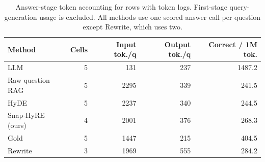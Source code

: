 \begin{table}[H]
\centering
\caption{Answer-stage token accounting for rows with token logs. First-stage query-generation usage is excluded. All methods use one scored answer call per question except Rewrite, which uses two.}
\label{tab:usage_metrics}
\footnotesize
\begin{tabular}{lrrrr}
\toprule
Method & Cells & Input tok./q & Output tok./q & Correct / 1M tok. \\
\midrule
LLM & 5 & 131 & 237 & 1487.2 \\
Raw question RAG & 5 & 2295 & 339 & 241.5 \\
HyDE & 5 & 2237 & 340 & 244.5 \\
Snap-HyRE (ours) & 4 & 2001 & 376 & 268.3 \\
Gold & 5 & 1447 & 215 & 404.5 \\
Rewrite & 3 & 1969 & 555 & 284.2 \\
\bottomrule
\end{tabular}
\end{table}
